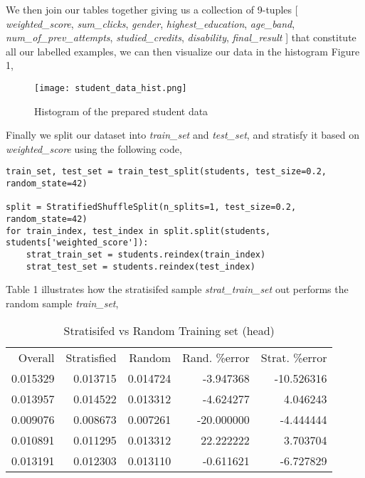 \documentclass[8pt]{article}
\begin{document}
We then join our tables together giving us a collection of 9-tuples [ \textit{weighted\_score}, \textit{sum\_clicks}, \textit{gender}, \textit{highest\_education}, \textit{age\_band}, \textit{num\_of\_prev\_attempts}, \textit{studied\_credits}, \textit{disability}, \textit{final\_result} ] that constitute all our labelled examples, we can then visualize our data in the histogram Figure 1,
\newline
\begin{figure}[!h]
\texttt{[image: student\_data\_hist.png]}
\caption{Histogram of the prepared student data }
\end{figure}
\newline
\newpage
Finally we split our dataset into \textit{train\_set} and \textit{test\_set}, and stratisfy it based on \textit{weighted\_score} using the following code,
\newline
\newline
\begin{adjustbox}{max width=\textwidth}
\begin{lstlisting}
train_set, test_set = train_test_split(students, test_size=0.2, random_state=42)

split = StratifiedShuffleSplit(n_splits=1, test_size=0.2, random_state=42)
for train_index, test_index in split.split(students, students['weighted_score']):
    strat_train_set = students.reindex(train_index)
    strat_test_set = students.reindex(test_index)
\end{lstlisting}
\end{adjustbox}
\newline
\newline
Table 1 illustrates how the stratisifed sample \textit{strat\_train\_set} out performs the random sample \textit{train\_set},
\newline
\begin{table}[h!]
  \centering
  \begin{adjustbox}{max width=\textwidth}
\begin{tabular}{rrrrr}
  Overall &  Stratisfied &    Random &  Rand. \%error &  Strat. \%error \\
 0.015329 &     0.013715 &  0.014724 &     -3.947368 &     -10.526316 \\
 0.013957 &     0.014522 &  0.013312 &     -4.624277 &       4.046243 \\
 0.009076 &     0.008673 &  0.007261 &    -20.000000 &      -4.444444 \\
 0.010891 &     0.011295 &  0.013312 &     22.222222 &       3.703704 \\
 0.013191 &     0.012303 &  0.013110 &     -0.611621 &      -6.727829 \\
\end{tabular}
\end{adjustbox}
  \caption{Stratisifed vs Random Training set (head)}
  \label{tab:label_test}
\end{table}
\end{document}
